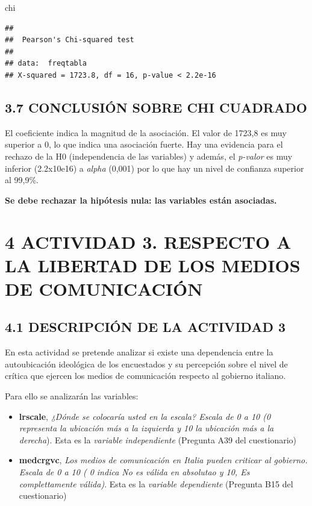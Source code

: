 \documentclass[
  12 pt,
  a4paper,
]{article}
\newenvironment{Shaded}{\begin{snugshade}}{\end{snugshade}}
\newcommand{\NormalTok}[1]{#1}
\begin{document}
\begin{Shaded}
\begin{Highlighting}[]
\NormalTok{chi}
\end{Highlighting}
\end{Shaded}

\begin{verbatim}
## 
##  Pearson's Chi-squared test
## 
## data:  freqtabla
## X-squared = 1723.8, df = 16, p-value < 2.2e-16
\end{verbatim}

\subsection{3.7 CONCLUSIÓN SOBRE CHI
CUADRADO}\label{conclusiuxf3n-sobre-chi-cuadrado}

El coeficiente indica la magnitud de la asociación. El valor de 1723,8
es muy superior a 0, lo que indica una asociación fuerte. Hay una
evidencia para el rechazo de la H0 (independencia de las variables) y
además, el \emph{p-valor} es muy inferior (2.2x10e16) a \emph{alpha}
(0,001) por lo que hay un nivel de confianza superior al 99,9\%.

\textbf{Se debe rechazar la hipótesis nula: las variables están
asociadas.}

\newpage

\section{4 ACTIVIDAD 3. RESPECTO A LA LIBERTAD DE LOS MEDIOS DE
COMUNICACIÓN}\label{actividad-3.-respecto-a-la-libertad-de-los-medios-de-comunicaciuxf3n}

\subsection{4.1 DESCRIPCIÓN DE LA ACTIVIDAD
3}\label{descripciuxf3n-de-la-actividad-3}

En esta actividad se pretende analizar si existe una dependencia entre
la autoubicación ideológica de los encuestados y su percepción sobre el
nivel de crítica que ejercen los medios de comunicación respecto al
gobierno italiano.

Para ello se analizarán las variables:

\begin{itemize}
\item
  \textbf{lrscale}, \emph{¿Dónde se colocaría usted en la escala? Escala
  de 0 a 10 (0 representa la ubicación más a la izquierda y 10 la
  ubicación más a la derecha}). Esta es la \emph{variable independiente}
  (Pregunta A39 del cuestionario)
\item
  \textbf{medcrgvc}, \emph{Los medios de comunicación en Italia pueden
  criticar al gobierno. Escala de 0 a 10 ( 0 indica No es válida en
  absolutao y 10, Es complettamente válida)}. Esta es la \emph{variable
  dependiente} (Pregunta B15 del cuestionario)
\end{itemize}
\end{document}
